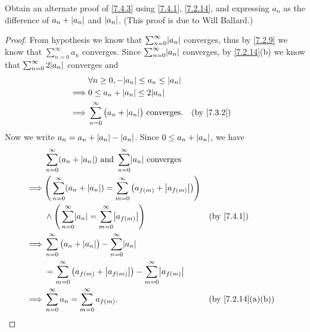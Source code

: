 \begin{ex}\label{ex:7.4.2}
  Obtain an alternate proof of \cref{7.4.3} using \cref{7.4.1}, \cref{7.2.14}, and expressing \(a_n\) as the difference of \(a_n + \left\lvert a_n\right\rvert\) and \(\left\lvert a_n\right\rvert\).
  (This proof is due to Will Ballard.)
\end{ex}

\begin{proof}
  From hypothesis we know that \(\sum_{n = 0}^\infty \abs{a_n}\) converges, thus by \cref{7.2.9} we know that \(\sum_{n = 0}^\infty a_n\) converges.
  Since \(\sum_{n = 0}^\infty \abs{a_n}\) converges, by \cref{7.2.14}(b) we know that \(\sum_{n = 0}^\infty 2 \abs{a_n}\) converges and
  \begin{align*}
             & \forall n \geq 0, -\abs{a_n} \leq a_n \leq \abs{a_n}                             \\
    \implies & 0 \leq a_n + \abs{a_n} \leq 2\abs{a_n}                                           \\
    \implies & \sum_{n = 0}^\infty \big(a_n + \abs{a_n}\big) \text{ converges}. &  & \by{7.3.2}
  \end{align*}
  Now we write \(a_n = a_n + \left\lvert a_n\right\rvert - \left\lvert a_n\right\rvert\).
  Since \(0 \leq a_n + \left\lvert a_n\right\rvert\), we have
  \begin{align*}
             & \sum_{n = 0}^\infty (a_n + \abs{a_n}) \text{ and } \sum_{n = 0}^\infty \abs{a_n} \text{ converges}                                \\
    \implies & \Bigg(\sum_{n = 0}^\infty (a_n + \abs{a_n}) = \sum_{m = 0}^\infty \big(a_{f(m)} + \abs{a_{f(m)}}\big)\Bigg)                       \\
             & \land \Bigg(\sum_{n = 0}^\infty \abs{a_n} = \sum_{m = 0}^\infty \abs{a_{f(m)}}\Bigg)                        &  & \by{7.4.1}       \\
    \implies & \sum_{n = 0}^\infty \big(a_n + \abs{a_n}\big) - \sum_{n = 0}^\infty \abs{a_n}                                                     \\
             & = \sum_{m = 0}^\infty \big(a_{f(m)} + \abs{a_{f(m)}}\big) - \sum_{m = 0}^\infty \abs{a_{f(m)}}                                    \\
    \implies & \sum_{n = 0}^\infty a_n = \sum_{m = 0}^\infty a_{f(m)}.                                                     &  & \by{7.2.14}[a,b]
  \end{align*}
\end{proof}
